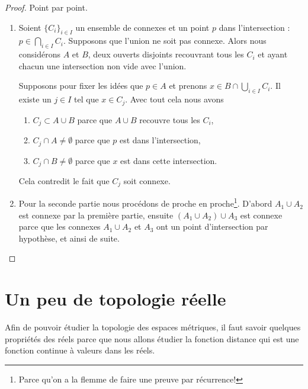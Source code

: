 \begin{proof}
    Point par point.
    \begin{enumerate}
        \item
    Soient \( \{ C_i \}_{i\in I}\) un ensemble de connexes et un point \( p\) dans l'intersection : \( p\in\bigcap_{i\in I}C_i\). Supposons que l'union ne soit pas connexe. Alors nous considérons \( A\) et \( B\), deux ouverts disjoints recouvrant tous les \( C_i\) et ayant chacun une intersection non vide avec l'union.

    Supposons pour fixer les idées que \( p\in A\) et prenons \( x\in B\cap\bigcup_{i\in I}C_i\). Il existe un \( j\in I\) tel que \( x\in C_j\). Avec tout cela nous avons
    \begin{enumerate}
        \item
            \( C_j\subset A\cup B\) parce que \(A \cup B\) recouvre tous les \( C_i \),
        \item
            \( C_j\cap A\neq \emptyset\) parce que \( p\) est dans l'intersection,
        \item
            \( C_j\cap B\neq\emptyset\) parce que \( x\) est dans cette intersection.
    \end{enumerate}
    Cela contredit le fait que \( C_j\) soit connexe.

\item

    Pour la seconde partie nous procédons de proche en proche\footnote{Parce qu'on a la flemme de faire une preuve par récurrence!}. D'abord \( A_1\cup A_2\) est connexe par la première partie, ensuite \( (A_1\cup A_2)\cup A_3\) est connexe parce que les connexes \( A_1\cup A_2\) et \( A_3\) ont un point d'intersection par hypothèse, et ainsi de suite.
    \end{enumerate}
\end{proof}
\section{Un peu de topologie réelle}

Afin de pouvoir étudier la topologie des espaces métriques, il faut savoir quelques propriétés des réels parce que nous allons étudier la fonction distance qui est une fonction continue à valeurs dans les réels.

